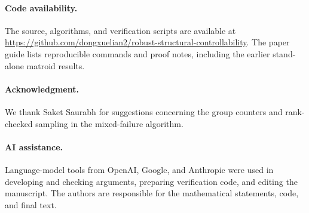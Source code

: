 \documentclass[11pt]{article}
\theoremstyle{definition}
\theoremstyle{remark}\newtheorem{remark}[theorem]{Remark}
\begin{document}
\paragraph{Code availability.}
The source, algorithms, and verification scripts are available
at \url{https://github.com/dongxuelian2/robust-structural-controllability}.
The paper guide lists reproducible commands and proof notes,
including the earlier stand-alone matroid results.

\paragraph{Acknowledgment.}
We thank Saket Saurabh for suggestions concerning the group
counters and rank-checked sampling in the mixed-failure algorithm.

\paragraph{AI assistance.}
Language-model tools from OpenAI, Google, and Anthropic were used
in developing and checking arguments, preparing verification
code, and editing the manuscript. The authors are responsible
for the mathematical statements, code, and final text.
\end{document}
